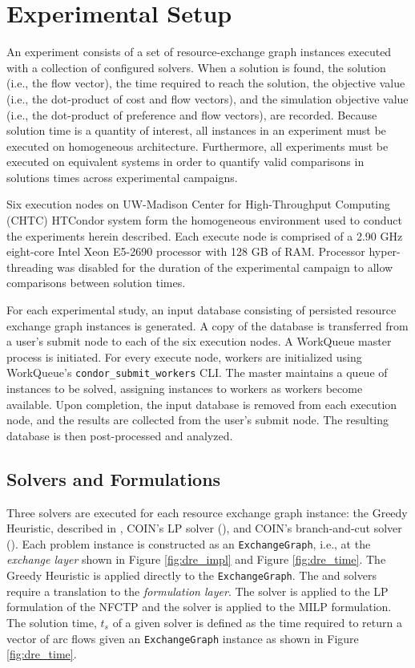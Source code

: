 
\section{Experimental Setup}\label{results:setup}

An experiment consists of a set of resource-exchange graph instances executed
with a collection of configured solvers. When a solution is found, the solution
(i.e., the flow vector), the time required to reach the solution, the objective
value (i.e., the dot-product of cost and flow vectors), and the simulation
objective value (i.e., the dot-product of preference and flow vectors), are
recorded. Because solution time is a quantity of interest, all instances in an
experiment must be executed on homogeneous architecture. Furthermore, all
experiments must be executed on equivalent systems in order to quantify valid
comparisons in solutions times across experimental campaigns.

Six execution nodes on UW-Madison Center for High-Throughput Computing (CHTC)
HTCondor system form the homogeneous environment used to conduct the experiments
herein described. Each execute node is comprised of a 2.90 GHz eight-core Intel
Xeon E5-2690 \cite{intelproc} processor with 128 GB of RAM. Processor
hyper-threading was disabled for the duration of the experimental campaign to
allow comparisons between solution times.

For each experimental study, an input database consisting of persisted resource
exchange graph instances is generated. A copy of the database is transferred
from a user's submit node to each of the six execution nodes. A WorkQueue master
process is initiated. For every execute node, workers are initialized using
WorkQueue's \texttt{condor\_submit\_workers} CLI. The master maintains a queue
of instances to be solved, assigning instances to workers as workers become
available. Upon completion, the input database is removed from each execution
node, and the results are collected from the user's submit node. The resulting
database is then post-processed and analyzed.

\subsection{Solvers and Formulations}

Three solvers are executed for each resource exchange graph instance: the Greedy
Heuristic, described in , COIN's LP solver
(\clp), and COIN's branch-and-cut solver (\cbc). Each problem instance
is constructed as an \texttt{ExchangeGraph}, i.e., at the \textit{exchange
  layer} shown in Figure \ref{fig:dre_impl} and Figure \ref{fig:dre_time}. The
Greedy Heuristic is applied directly to the \texttt{ExchangeGraph}. The \clp and
\cbc solvers require a translation to the \textit{formulation layer}. The \clp
solver is applied to the LP formulation of the NFCTP and the \cbc solver is
applied to the MILP formulation. The solution time, $t_s$ of a given solver is
defined as the time required to return a vector of arc flows given an
\texttt{ExchangeGraph} instance as shown in Figure \ref{fig:dre_time}.

